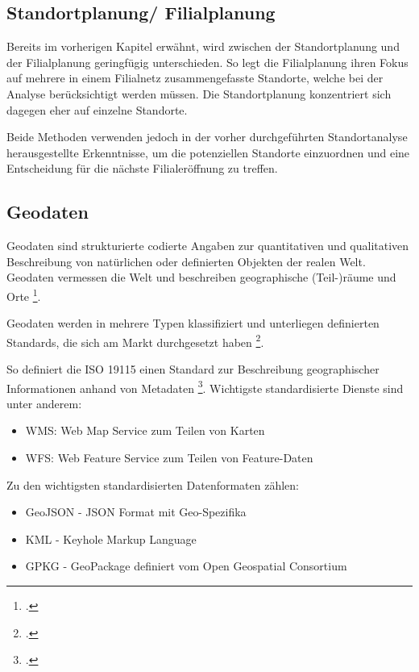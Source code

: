 \subsection{Standortplanung/ Filialplanung}
Bereits im vorherigen Kapitel erwähnt, wird zwischen der Standortplanung und der Filialplanung geringfügig unterschieden.
So legt die Filialplanung ihren Fokus auf mehrere in einem Filialnetz zusammengefasste Standorte, welche bei der Analyse berücksichtigt werden müssen.
Die Standortplanung konzentriert sich dagegen eher auf einzelne Standorte.

Beide Methoden verwenden jedoch in der vorher durchgeführten Standortanalyse herausgestellte Erkenntnisse, um die potenziellen Standorte einzuordnen und eine Entscheidung für die nächste Filialeröffnung zu treffen.

\subsection{Geodaten}
Geodaten sind strukturierte codierte Angaben zur quantitativen und qualitativen Beschreibung von natürlichen oder definierten Objekten der realen Welt. 
Geodaten vermessen die Welt und beschreiben geographische (Teil-)räume und Orte \footcite{geomarketing_geodaten}.

Geodaten werden in mehrere Typen klassifiziert und unterliegen definierten Standards, die sich am Markt durchgesetzt haben \footcite{gistandards.eu}.

So definiert die ISO 19115 einen Standard zur Beschreibung geographischer Informationen anhand von Metadaten \footcite{19115_iso}.
Wichtigste standardisierte Dienste sind unter anderem:

\begin{itemize}
	\item WMS: Web Map Service zum Teilen von Karten
	\item WFS: Web Feature Service zum Teilen von Feature-Daten
\end{itemize}

Zu den wichtigsten standardisierten Datenformaten zählen:

\begin{itemize}
	\item GeoJSON - JSON Format mit Geo-Spezifika
	\item KML - Keyhole Markup Language 
	\item GPKG - GeoPackage definiert vom Open Geospatial Consortium
\end{itemize}

